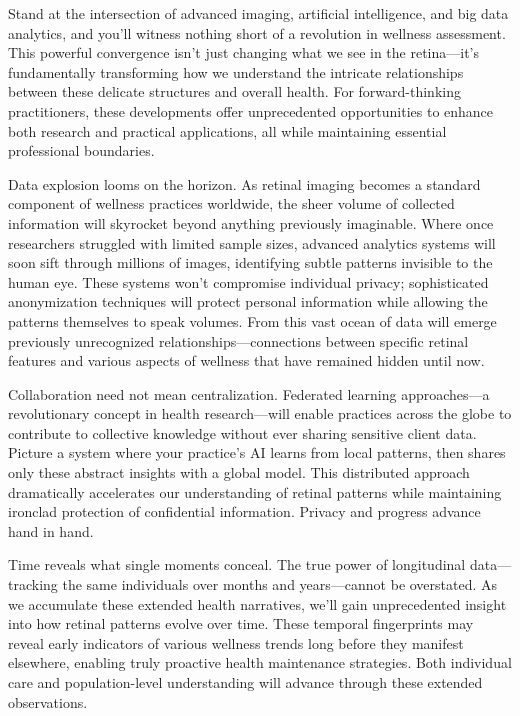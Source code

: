 \documentclass[
  Letterpaper,
]{scrbook}
\begin{document}
Stand at the intersection of advanced imaging, artificial intelligence,
and big data analytics, and you'll witness nothing short of a revolution
in wellness assessment. This powerful convergence isn't just changing
what we see in the retina---it's fundamentally transforming how we
understand the intricate relationships between these delicate structures
and overall health. For forward-thinking practitioners, these
developments offer unprecedented opportunities to enhance both research
and practical applications, all while maintaining essential professional
boundaries.

Data explosion looms on the horizon. As retinal imaging becomes a
standard component of wellness practices worldwide, the sheer volume of
collected information will skyrocket beyond anything previously
imaginable. Where once researchers struggled with limited sample sizes,
advanced analytics systems will soon sift through millions of images,
identifying subtle patterns invisible to the human eye. These systems
won't compromise individual privacy; sophisticated anonymization
techniques will protect personal information while allowing the patterns
themselves to speak volumes. From this vast ocean of data will emerge
previously unrecognized relationships---connections between specific
retinal features and various aspects of wellness that have remained
hidden until now.

Collaboration need not mean centralization. Federated learning
approaches---a revolutionary concept in health research---will enable
practices across the globe to contribute to collective knowledge without
ever sharing sensitive client data. Picture a system where your
practice's AI learns from local patterns, then shares only these
abstract insights with a global model. This distributed approach
dramatically accelerates our understanding of retinal patterns while
maintaining ironclad protection of confidential information. Privacy and
progress advance hand in hand.

Time reveals what single moments conceal. The true power of longitudinal
data---tracking the same individuals over months and years---cannot be
overstated. As we accumulate these extended health narratives, we'll
gain unprecedented insight into how retinal patterns evolve over time.
These temporal fingerprints may reveal early indicators of various
wellness trends long before they manifest elsewhere, enabling truly
proactive health maintenance strategies. Both individual care and
population-level understanding will advance through these extended
observations.
\end{document}
